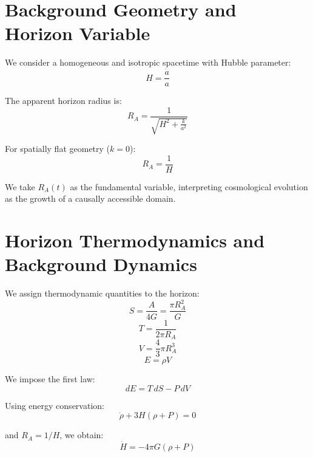 \documentclass[12pt,a4paper]{article}
\begin{document}
\section{Background Geometry and Horizon Variable}

We consider a homogeneous and isotropic spacetime with Hubble parameter:
\begin{equation}
H = \frac{\dot{a}}{a} \tag{1}
\end{equation}

The apparent horizon radius is:
\begin{equation}
R_A = \frac{1}{\sqrt{H^2 + \frac{k}{a^2}}} \tag{2}
\end{equation}

For spatially flat geometry ($k = 0$):
\begin{equation}
R_A = \frac{1}{H} \tag{3}
\end{equation}

We take $R_A(t)$ as the fundamental variable, interpreting cosmological evolution as the growth of a causally accessible domain.

\section{Horizon Thermodynamics and Background Dynamics}

We assign thermodynamic quantities to the horizon:
\begin{equation}
S = \frac{A}{4G} = \frac{\pi R_A^2}{G} \tag{4}
\end{equation}
\begin{equation}
T = \frac{1}{2\pi R_A} \tag{5}
\end{equation}
\begin{equation}
V = \frac{4}{3}\pi R_A^3 \tag{6}
\end{equation}
\begin{equation}
E = \rho V \tag{7}
\end{equation}

We impose the first law:
\begin{equation}
dE = T\,dS - P\,dV \tag{8}
\end{equation}

Using energy conservation:
\begin{equation}
\dot{\rho} + 3H(\rho + P) = 0 \tag{9}
\end{equation}

and $R_A = 1/H$, we obtain:
\begin{equation}
\dot{H} = -4\pi G(\rho + P) \tag{10}
\end{equation}
\end{document}
